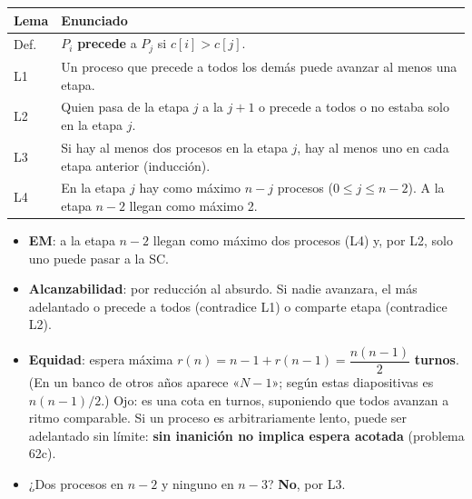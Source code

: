 \documentclass[11pt,a4paper,oneside]{report}
\begin{document}
\begin{center}\small
\begin{tabular}{lp{11.8cm}}
\toprule
\textbf{Lema} & \textbf{Enunciado} \\ \midrule
Def. & $P_i$ \textbf{precede} a $P_j$ si $c[i] > c[j]$. \\
L1 & Un proceso que precede a todos los demás puede avanzar al menos una etapa. \\
L2 & Quien pasa de la etapa $j$ a la $j+1$ o precede a todos o no estaba solo en la etapa $j$. \\
L3 & Si hay al menos dos procesos en la etapa $j$, hay al menos uno en cada etapa anterior (inducción). \\
L4 & En la etapa $j$ hay como máximo $n - j$ procesos ($0 \le j \le n-2$). A la etapa $n-2$ llegan como máximo 2. \\
\bottomrule
\end{tabular}
\end{center}
\begin{itemize}[leftmargin=*]
  \item \textbf{EM}: a la etapa $n-2$ llegan como máximo dos procesos (L4) y, por L2, solo uno puede pasar a la SC.
  \item \textbf{Alcanzabilidad}: por reducción al absurdo. Si nadie avanzara, el más adelantado o precede a todos
        (contradice L1) o comparte etapa (contradice L2).
  \item \textbf{Equidad}: espera máxima $r(n) = n - 1 + r(n-1) = \dfrac{n(n-1)}{2}$ \textbf{turnos}.
        (En un banco de otros años aparece «$N-1$»; según estas diapositivas es $n(n-1)/2$.) Ojo: es una cota en
        turnos, suponiendo que todos avanzan a ritmo comparable. Si un proceso es arbitrariamente lento, puede ser
        adelantado sin límite: \textbf{sin inanición no implica espera acotada} (problema 62c).
  \item ¿Dos procesos en $n-2$ y ninguno en $n-3$? \textbf{No}, por L3.
\end{itemize}

\end{document}

